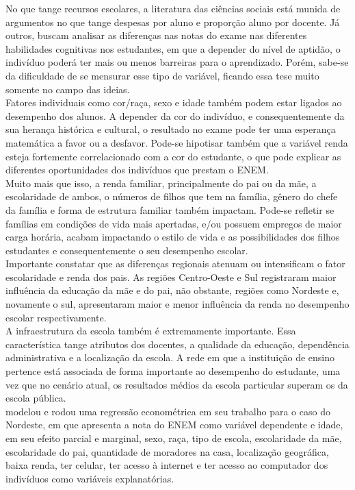 \documentclass[tcc1,project]{uftex}
\begin{document}
No que tange recursos escolares, a literatura das ciências sociais está munida de argumentos no que tange despesas por aluno e proporção aluno por docente. Já outros, buscam analisar as diferenças nas notas do exame nas diferentes habilidades cognitivas nos estudantes, em que a depender do nível de aptidão, o indivíduo poderá ter mais ou menos barreiras para o aprendizado. Porém, sabe-se da dificuldade de se mensurar esse tipo de variável, ficando essa tese muito somente no campo das ideias. \\

Fatores individuais como cor/raça, sexo e idade também podem estar ligados ao desempenho dos alunos. A depender da cor do indivíduo, e consequentemente da sua herança histórica e cultural, o resultado no exame pode ter uma esperança matemática a favor ou a desfavor. Pode-se hipotisar também que a variável renda esteja fortemente correlacionado com a cor do estudante, o que pode explicar as diferentes oportunidades dos indivíduos que prestam o ENEM. \\

Muito mais que isso, a renda familiar, principalmente do pai ou da mãe, a escolaridade de ambos, o números de filhos que tem na família, gênero do chefe da família e forma de estrutura familiar também impactam. Pode-se refletir se famílias em condições de vida mais apertadas, e/ou possuem empregos de maior carga horária, acabam impactando o estilo de vida e as possibilidades dos filhos estudantes e consequentemente o seu desempenho escolar. \\

Importante constatar que as diferenças regionais atenuam ou intensificam o fator escolaridade e renda dos pais. As regiões Centro-Oeste e Sul registraram maior influência da educação da mãe e do pai, não obstante, regiões como Nordeste e, novamente o sul, apresentaram maior e menor influência da renda no desempenho escolar respectivamente. \\

A infraestrutura da escola também é extremamente importante. Essa característica tange atributos dos docentes, a qualidade da educação, dependência administrativa e a localização da escola. A rede em que a instituição de ensino pertence está associada de forma importante ao desempenho do estudante, uma vez que no cenário atual, os resultados médios da escola particular superam os da escola pública. \\

 modelou e rodou uma regressão econométrica em seu trabalho para o caso do Nordeste, em que apresenta a nota do ENEM como variável dependente e idade, em seu efeito parcial e marginal, sexo, raça, tipo de escola, escolaridade da mãe, escolaridade do pai, quantidade de moradores na casa, localização geográfica, baixa renda, ter celular, ter acesso à internet e ter acesso ao computador dos indivíduos como variáveis explanatórias. \\
\end{document}

